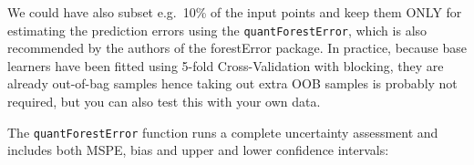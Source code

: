 \documentclass[
  graybox,natbib,nospthms]{svmono}
\newenvironment{Shaded}{\begin{snugshade}}{\end{snugshade}}
\newcommand{\AttributeTok}[1]{\textcolor[rgb]{0.61,0.61,0.61}{#1}}
\newcommand{\DecValTok}[1]{\textcolor[rgb]{0.06,0.06,0.06}{#1}}
\newcommand{\FloatTok}[1]{\textcolor[rgb]{0.06,0.06,0.06}{#1}}
\newcommand{\FunctionTok}[1]{\textcolor[rgb]{0,0,0}{#1}}
\newcommand{\NormalTok}[1]{#1}
\newcommand{\OtherTok}[1]{\textcolor[rgb]{0.37,0.37,0.37}{#1}}
\newcommand{\SpecialCharTok}[1]{\textcolor[rgb]{0,0,0}{#1}}
\begin{document}
\begin{Shaded}
\end{Shaded}

We could have also subset e.g.~10\% of the input points and keep them ONLY for
estimating the prediction errors using the \texttt{quantForestError}, which is also
recommended by the authors of the forestError package. In practice, because
base learners have been fitted using 5-fold Cross-Validation with blocking,
they are already out-of-bag samples hence taking out extra OOB samples is
probably not required, but you can also test this with your own data.

The \texttt{quantForestError} function runs a complete uncertainty assessment and
includes both MSPE, bias and upper and lower confidence intervals:
\end{document}
